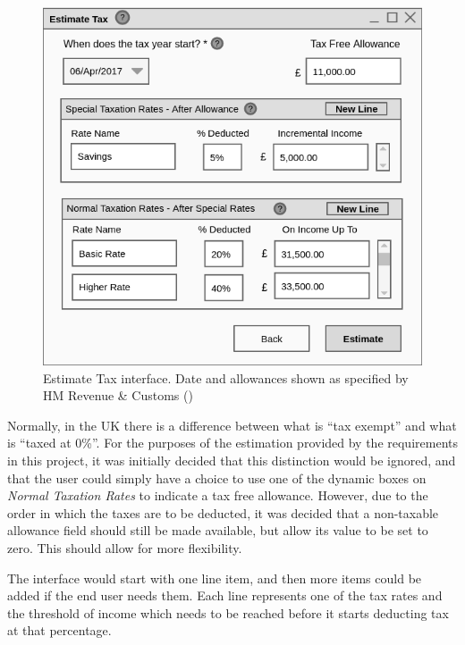 \begin{figure}[ht!]
  \begin{center}
    \includegraphics[width=14cm]{./contents/img/Wireframe_-_Estimate_Tax.png}
  \end{center}
  \caption{Estimate Tax interface. Date and allowances shown as specified by HM
    Revenue \& Customs (\cite[][]{hmrc2018taxrates})}
  \label{fig:Wireframe.EstimateTax}
\end{figure}
\FloatBarrier

Normally, in the UK there is a difference between what is ``tax exempt'' and
what is ``taxed at 0\%''.  For the purposes of the estimation provided by
the requirements in this project, it was initially decided that this
distinction would be ignored, and that the user could simply have a choice to
use one of the dynamic boxes on \emph{Normal Taxation Rates} to indicate a tax
free allowance. However, due to the order in which the taxes are to be
deducted, it was decided that a non-taxable allowance field should still be
made available, but allow its value to be set to zero. This should allow for
more flexibility.

The interface would start with one line item, and then more items could be
added if the end user needs them. Each line represents one of the tax rates and
the threshold of income which needs to be reached before it starts deducting
tax at that percentage.


